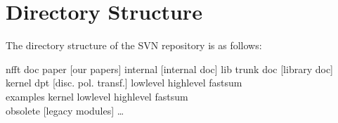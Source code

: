 \section{Directory Structure}

The directory structure of the SVN repository is as follows:

{
\scriptsize
\tree nfft                                       
  \subtree doc
    \subtree 
      paper
      [our papers]
    \endsubtree 
    \subtree 
      internal
      [internal doc]
    \endsubtree 
  \endsubtree 
  \subtree lib 
    \subtree trunk
	    \subtree 
        doc
        [library doc]
	    \endsubtree 
	    \subtree kernel
	      \subtree 
          dpt
          [disc. pol. transf.]
	      \endsubtree 
	    \endsubtree 
	    \subtree lowlevel
	    \endsubtree 
	    \subtree highlevel
	      \subtree
          fastsum\\
          [fast summation]
	      \endsubtree     
	    \endsubtree 
	    \subtree examples
		    \subtree kernel
		    \endsubtree 
		    \subtree lowlevel
		    \endsubtree 
		    \subtree highlevel
		      \subtree
	          fastsum\\
	          [fast summation]
		      \endsubtree     
		    \endsubtree 	    
	    \endsubtree 
	  \endsubtree 
	\endsubtree  
  \subtree
     obsolete
     [legacy 
     modules]
    \subtree \dots
    \endsubtree 
  \endsubtree 
\endtree 
}
